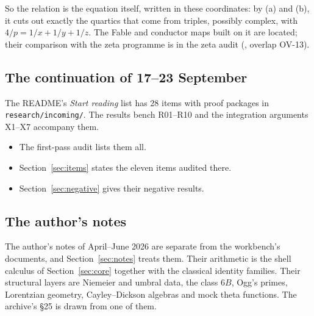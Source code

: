 So the relation is the equation itself, written in these coordinates: by (a) and (b), it cuts out exactly the quartics that come from triples, possibly complex, with $4/p=1/x+1/y+1/z$. The Fable and conductor maps built on it are \textsf{located}; their comparison with the zeta programme is in the zeta audit (, overlap OV-13).

\subsection{The continuation of 17--23 September}\label{ssec:continuation}

The README's \emph{Start reading} list has 28 items with proof packages in \texttt{research/incoming/}. The results bench R01--R10 and the integration arguments X1--X7 accompany them.
\begin{itemize}
\item The first-pass audit  lists them all.
\item Section~\ref{sec:items} states the eleven items audited there.
\item Section~\ref{sec:negative} gives their negative results.
\end{itemize}

\subsection{The author's notes}\label{ssec:notescorpus}

The author's notes of April--June 2026 are separate from the workbench's documents, and Section~\ref{sec:notes} treats them. Their arithmetic is the shell calculus of Section~\ref{sec:core} together with the classical identity families. Their structural layers are Niemeier and umbral data, the class $6B$, Ogg's primes, Lorentzian geometry, Cayley--Dickson algebras and mock theta functions. The archive's §25 is drawn from one of them.

